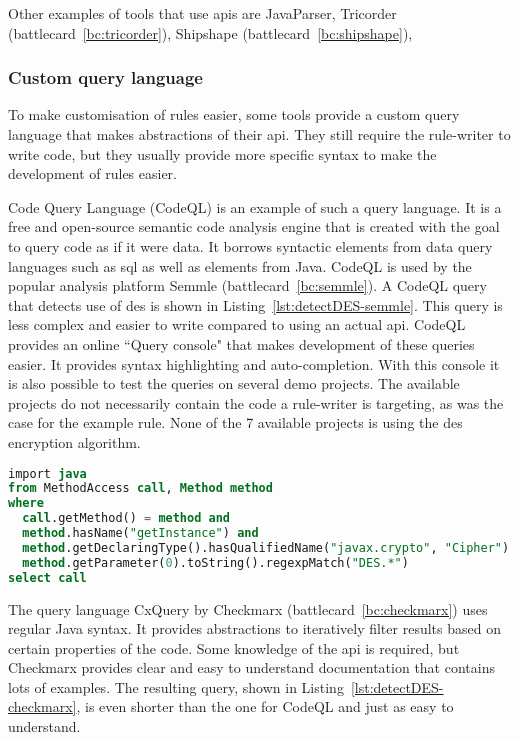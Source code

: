 Other examples of tools that use \glspl{api} are JavaParser, Tricorder (battlecard~\ref{bc:tricorder}), Shipshape (battlecard~\ref{bc:shipshape}), 

\subsubsection{Custom query language}
To make customisation of rules easier, some tools provide a custom query language that makes abstractions of their \gls{api}.
They still require the rule-writer to write code, but they usually provide more specific syntax to make the development of rules easier.

Code Query Language (CodeQL) is an example of such a query language.
It is a free and open-source semantic code analysis engine that is created with the goal to query code as if it were data.
It borrows syntactic elements from data query languages such as \gls{sql} as well as elements from Java.
CodeQL is used by the popular analysis platform Semmle (battlecard~\ref{bc:semmle}).
A CodeQL query that detects use of \gls{des} is shown in Listing~\ref{lst:detectDES-semmle}.
This query is less complex and easier to write compared to using an actual \gls{api}.
CodeQL provides an online ``Query console" that makes development of these queries easier.
It provides syntax highlighting and auto-completion.
With this console it is also possible to test the queries on several demo projects.
The available projects do not necessarily contain the code a rule-writer is targeting, as was the case for the example rule.
None of the 7 available projects is using the \gls{des} encryption algorithm.

\begin{lstlisting}[language={sql},caption={CodeQL query used by Semmle to find use of insecure algorithm DES.},label={lst:detectDES-semmle},abovecaptionskip=-0.0pt,xleftmargin=15pt]
import java
from MethodAccess call, Method method
where
  call.getMethod() = method and
  method.hasName("getInstance") and
  method.getDeclaringType().hasQualifiedName("javax.crypto", "Cipher") and
  method.getParameter(0).toString().regexpMatch("DES.*")
select call
\end{lstlisting}

The query language CxQuery by Checkmarx (battlecard~\ref{bc:checkmarx}) uses regular Java syntax.
It provides abstractions to iteratively filter results based on certain properties of the code.
Some knowledge of the \gls{api} is required, but Checkmarx provides  clear and easy to understand documentation that contains lots of examples.
The resulting query, shown in Listing~\ref{lst:detectDES-checkmarx}, is even shorter than the one for CodeQL and just as easy to understand.

